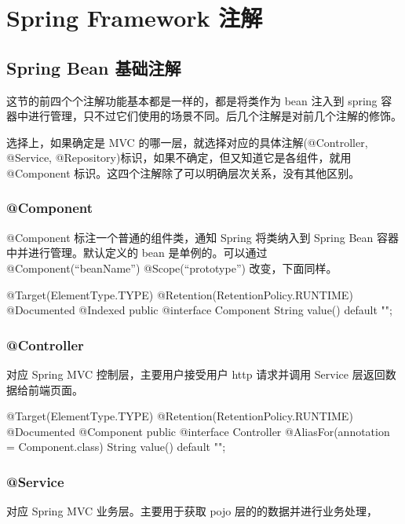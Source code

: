 \section{Spring Framework 注解}
\subsection{Spring Bean 基础注解}

这节的前四个个注解功能基本都是一样的，都是将类作为 bean 注入到 spring 容器中进行管理，只不过它们使用的场景不同。后几个注解是对前几个注解的修饰。

选择上，如果确定是 MVC 的哪一层，就选择对应的具体注解(@Controller, @Service, @Repository)标识，如果不确定，但又知道它是各组件，就用 @Component 标识。这四个注解除了可以明确层次关系，没有其他区别。

\subsubsection{@Component}

@Component 标注一个普通的组件类，通知 Spring 将类纳入到 Spring Bean 容器中并进行管理。默认定义的 bean 是单例的。可以通过 @Component(“beanName”) @Scope(“prototype”) 改变，下面同样。

\begin{Java}
@Target(ElementType.TYPE)
@Retention(RetentionPolicy.RUNTIME)
@Documented
@Indexed
public @interface Component {
    String value() default "";
}
\end{Java}

\subsubsection{@Controller}

对应 Spring MVC 控制层，主要用户接受用户 http 请求并调用 Service 层返回数据给前端页面。

\begin{Java}
@Target(ElementType.TYPE)
@Retention(RetentionPolicy.RUNTIME)
@Documented
@Component
public @interface Controller {
    @AliasFor(annotation = Component.class)
    String value() default "";
}
\end{Java}

\subsubsection{@Service}

对应 Spring MVC 业务层。主要用于获取 pojo 层的的数据并进行业务处理，

